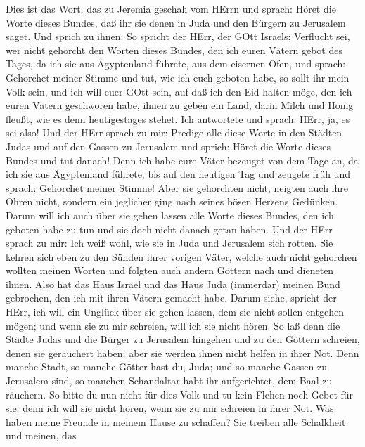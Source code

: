  Dies ist das Wort, das zu Jeremia geschah vom HErrn und
sprach:  Höret die Worte dieses Bundes, daß ihr sie denen in
Juda und den Bürgern zu Jerusalem saget.  Und sprich zu
ihnen: So spricht der HErr, der GOtt Israels: Verflucht sei, wer nicht
gehorcht den Worten dieses Bundes,  den ich euren Vätern
gebot des Tages, da ich sie aus Ägyptenland führete, aus dem eisernen
Ofen, und sprach: Gehorchet meiner Stimme und tut, wie ich euch geboten
habe, so sollt ihr mein Volk sein, und ich will euer GOtt sein,
 auf daß ich den Eid halten möge, den ich euren Vätern
geschworen habe, ihnen zu geben ein Land, darin Milch und Honig fleußt,
wie es denn heutigestages stehet. Ich antwortete und sprach: HErr, ja,
es sei also!  Und der HErr sprach zu mir: Predige alle diese
Worte in den Städten Judas und auf den Gassen zu Jerusalem und sprich:
Höret die Worte dieses Bundes und tut danach!  Denn ich habe
eure Väter bezeuget von dem Tage an, da ich sie aus Ägyptenland führete,
bis auf den heutigen Tag und zeugete früh und sprach: Gehorchet meiner
Stimme!  Aber sie gehorchten nicht, neigten auch ihre Ohren
nicht, sondern ein jeglicher ging nach seines bösen Herzens Gedünken.
Darum will ich auch über sie gehen lassen alle Worte dieses Bundes, den
ich geboten habe zu tun und sie doch nicht danach getan haben.
 Und der HErr sprach zu mir: Ich weiß wohl, wie sie in Juda
und Jerusalem sich rotten.  Sie kehren sich eben zu den
Sünden ihrer vorigen Väter, welche auch nicht gehorchen wollten meinen
Worten und folgten auch andern Göttern nach und dieneten ihnen. Also hat
das Haus Israel und das Haus Juda (immerdar) meinen Bund gebrochen, den
ich mit ihren Vätern gemacht habe.  Darum siehe, spricht
der HErr, ich will ein Unglück über sie gehen lassen, dem sie nicht
sollen entgehen mögen; und wenn sie zu mir schreien, will ich sie nicht
hören.  So laß denn die Städte Judas und die Bürger zu
Jerusalem hingehen und zu den Göttern schreien, denen sie geräuchert
haben; aber sie werden ihnen nicht helfen in ihrer Not. 
Denn manche Stadt, so manche Götter hast du, Juda; und so manche Gassen
zu Jerusalem sind, so manchen Schandaltar habt ihr aufgerichtet, dem
Baal zu räuchern.  So bitte du nun nicht für dies Volk und
tu kein Flehen noch Gebet für sie; denn ich will sie nicht hören, wenn
sie zu mir schreien in ihrer Not.  Was haben meine Freunde
in meinem Hause zu schaffen? Sie treiben alle Schalkheit und meinen, das
